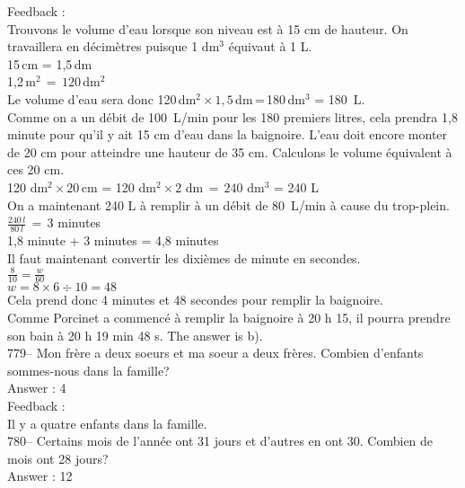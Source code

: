 ﻿\documentclass[letterpaper, 12pt]{article}
\begin{document}
Feedback : \\
Trouvons le volume d'eau lorsque son niveau est \`a 15 cm de hauteur. On
travaillera en d\'ecim\`etres puisque 1 dm$^{3}$ \'equivaut \`a 1 L.\\
15\,cm = 1,5\,dm\\
1,2\,m$^{2}\,=\,120$\,dm$^{2}$\\
Le volume d'eau sera donc 120\,dm$^{2}\times1,5$\,dm\,=\,180\,dm$^{3}$ =
180~L.\\

Comme on a un d\'ebit de 100~L/min pour les 180 premiers litres,  cela
prendra 1,8 minute pour qu'il y ait 15 cm d'eau dans la baignoire. L'eau
doit encore monter de 20 cm pour atteindre une hauteur de 35 cm. Calculons
le volume \'equivalent \`a ces 20 cm.\\

120 dm$^{2}\times 20$\,cm = 120 dm$^{2}\times 2$ dm$\,=\,240$ dm$^{3}$ = 240
L\\[2mm]
On a maintenant 240 L \`a remplir \`a un d\'ebit de 80~L/min \`a cause du
trop-plein.\\[2mm]
$\frac{240\,l}{80\,l}\,=\,3$ minutes\\[2mm]
1,8 minute + 3 minutes = 4,8 minutes\\[2mm]
Il faut maintenant convertir les dixi\`emes de minute en secondes.\\[2mm]
$\frac{8}{10}=\frac{w}{60}$\\[2mm]
$w=8\times6\div10=48$\\[2mm]
Cela prend donc 4 minutes et 48 secondes pour remplir la
baignoire.\\[2mm]
Comme Porcinet a commenc\'e \`a remplir la baignoire \`a 20 h 15, il pourra
prendre son bain \`a 20 h 19 min 48 s.  The answer is b).\\

779-- Mon fr\`ere a deux soeurs et ma soeur a deux fr\`eres.  Combien
d'enfants sommes-nous dans la famille?\\

Answer : 4\\

Feedback : \\
Il y a quatre enfants dans la famille.\\

780-- Certains mois de l'ann\'ee ont 31 jours et d'autres en ont 30.
Combien de mois ont 28 jours?\\

Answer : 12\\
\end{document}
